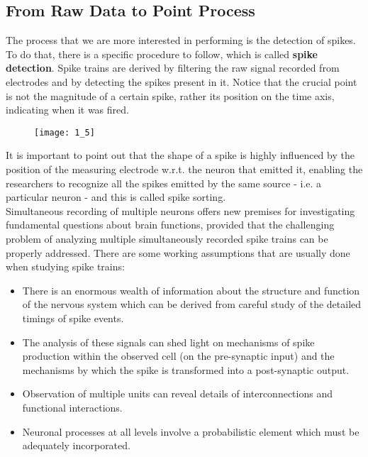 \subsection{From Raw Data to Point Process}
The process that we are more interested in performing is the detection of 
spikes. To do that, there is a specific procedure to follow, which is 
called \textbf{spike detection}.
Spike trains are derived by filtering the raw signal recorded from 
electrodes and by detecting the spikes present in it. Notice that the 
crucial point is not the magnitude of a certain spike, rather its position 
on the time axis, indicating when it was fired.
\begin{figure}[H]
    \texttt{[image: 1\_5]}
    \centering
\end{figure}
It is important to point out that the shape of a spike is highly 
influenced by the position of the measuring electrode w.r.t. the neuron 
that emitted it, enabling the researchers to recognize all the spikes 
emitted by the same source - i.e. a
particular neuron - and this is called spike sorting.\\


Simultaneous recording of multiple neurons offers new premises for 
investigating fundamental questions about brain functions, provided that 
the challenging problem of analyzing multiple simultaneously recorded 
spike trains can be properly addressed.
There are some working assumptions that are usually done when studying 
spike trains:
\begin{itemize}
    \item There is an enormous wealth of information about the structure 
and function of the nervous system which can be derived from careful study 
of the detailed timings of spike events. 
    \item The analysis of these signals can shed light on mechanisms of 
spike production within the observed cell (on the pre-synaptic input) and 
the mechanisms by which the spike is transformed into a post-synaptic 
output.
    \item Observation of multiple units can reveal details of 
interconnections and functional interactions.
    \item Neuronal processes at all levels involve a probabilistic element 
which must be adequately incorporated. 
\end{itemize}

